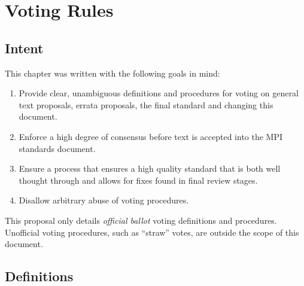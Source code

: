 \chapter{Voting Rules}


\section{Intent}

This chapter was written with the following goals in mind:

\begin{enumerate}
\item Provide clear, unambiguous definitions and procedures for voting
  on general text proposals, errata proposals, the final standard and changing this
  document.
\item Enforce a high degree of consensus before text is accepted into
  the MPI standards document.
\item Ensure a process that ensures a high quality standard that is both well thought through and allows for fixes found in final review stages.
\item Disallow arbitrary abuse of voting procedures.
\end{enumerate}

This proposal only details {\em official ballot} voting definitions
and procedures.  Unofficial voting procedures, such as ``straw''
votes, are outside the scope of this document.


\section{Definitions}

